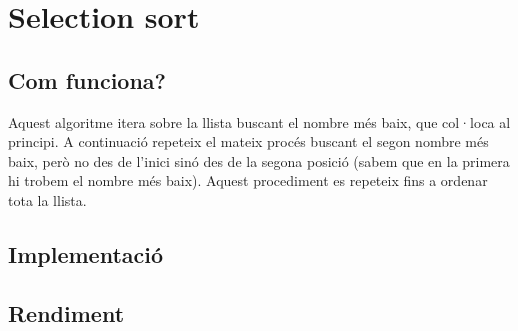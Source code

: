 \chapter{Selection sort}

\section{Com funciona?}
Aquest algoritme itera sobre la llista buscant el nombre més baix, que col·loca al principi.
A continuació repeteix el mateix procés buscant el segon nombre més baix, però no des de l'inici sinó des de la segona posició (sabem que en la primera hi trobem el nombre més baix).
Aquest procediment es repeteix fins a ordenar tota la llista.

\section{Implementació}

\vspace{1em}
\begin{minipage}{\textwidth}
	\section{Rendiment}
	\noindent
	\makebox[\textwidth][c]{
		
	}
	\vspace*{1em}
	\begin{center}
		\resizebox{\textwidth}{!}{}
	\end{center}
\end{minipage}
